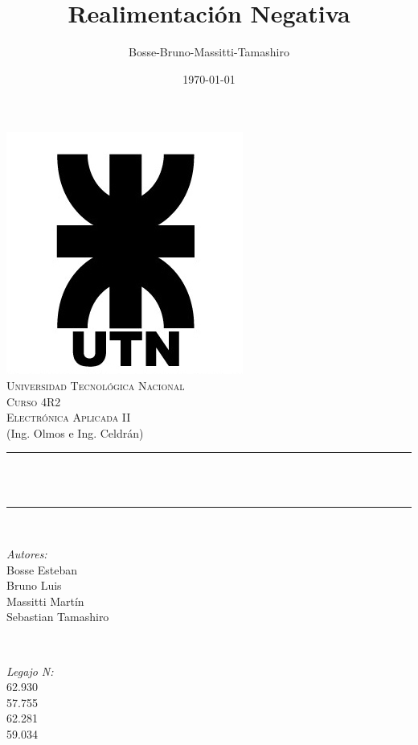 \documentclass[12pt]{article}
\title{Realimentación Negativa}								%
\author{Bosse-Bruno-Massitti-Tamashiro}								%
\date{\today}											%
\makeatletter
\let\thetitle\@title
\let\thedate\@date
\makeatother
\begin{document}

\begin{titlepage}
	\centering
    \vspace*{0.5 cm}
    \includegraphics[scale = 0.45]{utn_logo.jpg}\\[1.0 cm]	%
    \textsc{\LARGE Universidad Tecnológica Nacional}\\[2.0 cm]	%
	\textsc{\Large Curso 4R2}\\[0.5 cm]				%
	\textsc{\large Electrónica Aplicada II}\\[0 cm]				%
	\textrm{\large (Ing. Olmos e Ing. Celdrán)}\\[0.5 cm]
    \rule{\linewidth}{0.2 mm} \\[0.4 cm]
	{ \huge \bfseries \thetitle}\\
	\rule{\linewidth}{0.2 mm} \\[1 cm]
	
	\begin{minipage}{0.4\textwidth}
		\begin{flushleft} \large
			\emph{Autores:}\\
			Bosse Esteban\\Bruno Luis\\Massitti Martín\\Sebastian Tamashiro
			\end{flushleft}
			\end{minipage}~
			\begin{minipage}{0.4\textwidth}
			\begin{flushright} \large
			\emph{Legajo N:} \\
			 62.930\\57.755\\62.281\\59.034									%
		\end{flushright}
	\end{minipage}\\[2 cm]
	
	{\large \thedate}\\[2 cm]
 
	\vfill
	
\end{titlepage}
\end{document}
